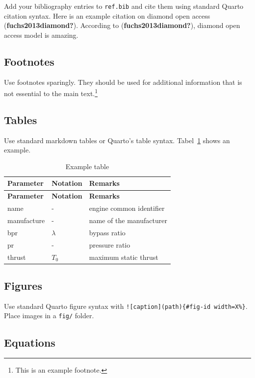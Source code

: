 \documentclass[
  manuscript=article,
  layout=publish,
  year=2026,
  volume=1,
]{den}
\begin{document}
Add your bibliography entries to \texttt{ref.bib} and cite them using
standard Quarto citation syntax. Here is an example citation on diamond
open access (\textbf{fuchs2013diamond?}). According to
(\textbf{fuchs2013diamond?}), diamond open access model is amazing.

\subsection{Footnotes}\label{footnotes}

Use footnotes sparingly. They should be used for additional information
that is not essential to the main text.\footnote{This is an example
  footnote.}

\subsection{Tables}\label{tables}

Use standard markdown tables or Quarto's table syntax.
Tabel~\ref{tbl-example} shows an example.

\begin{longtable}[]{@{}lll@{}}
\caption{Example table}\label{tbl-example}\tabularnewline
\toprule\noalign{}
\textbf{Parameter} & \textbf{Notation} & \textbf{Remarks} \\
\midrule\noalign{}
\endfirsthead
\toprule\noalign{}
\textbf{Parameter} & \textbf{Notation} & \textbf{Remarks} \\
\midrule\noalign{}
\endhead
\bottomrule\noalign{}
\endlastfoot
name & - & engine common identifier \\
manufacture & - & name of the manufacturer \\
bpr & \(\lambda\) & bypass ratio \\
pr & - & pressure ratio \\
thrust & \(T_0\) & maximum static thrust \\
\end{longtable}

\subsection{Figures}\label{figures}

Use standard Quarto figure syntax with
\texttt{!{[}caption{]}(path)\{\#fig-id\ width=X\%\}}. Place images in a
\texttt{fig/} folder.

\subsection{Equations}\label{equations}
\end{document}
